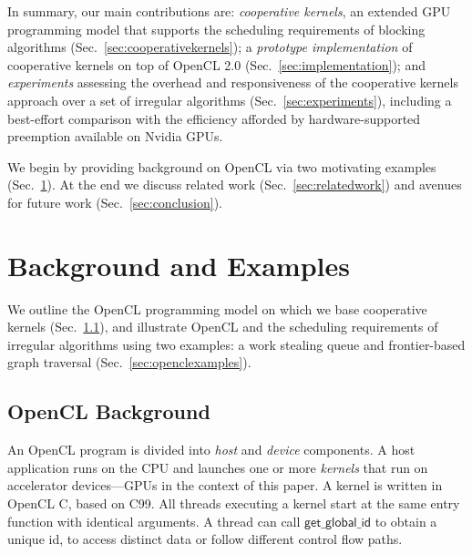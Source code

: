 \documentclass[sigconf]{acmart}
\makeatletter
\newcommand{\cutthree}[1]{}
\renewcommand\paragraph{\@startsection{paragraph}{4}{\z@}%
  {-.5\baselineskip \@plus -2\p@ \@minus -.2\p@}%
  {-3.5\p@}%
  {\bfseries\@parfont}}
\newcommand{\mysec}{Sec.~}
\newcommand{\getglobalid}{\mathsf{get\_global\_id}}
\makeatother
\begin{document}
In summary, our main contributions are:
\emph{cooperative kernels}, an extended GPU programming model that supports the scheduling requirements of blocking algorithms (\mysec\ref{sec:cooperativekernels}); a \emph{prototype implementation} of cooperative
  kernels on top of OpenCL 2.0
  (\mysec\ref{sec:implementation}); and \emph{experiments} assessing the overhead and responsiveness of the cooperative kernels approach over a set of irregular algorithms \cutthree{across three GPUs} (\mysec\ref{sec:experiments}), including a best-effort comparison with the efficiency afforded by hardware-supported preemption available on Nvidia GPUs.

We begin by providing background on OpenCL via two motivating examples (\mysec\ref{sec:background}).  At the end we discuss related work (\mysec\ref{sec:relatedwork}) and avenues for future work (\mysec\ref{sec:conclusion}).

\section{Background and Examples}\label{sec:background}

We outline the OpenCL programming model on which we
base cooperative kernels (\mysec\ref{sec:opencl}), and illustrate
OpenCL and the scheduling requirements of irregular algorithms using two examples: a work stealing queue and frontier-based graph traversal
(\mysec\ref{sec:openclexamples}).

\subsection{OpenCL Background}\label{sec:opencl}



An OpenCL program is divided into \emph{host} and \emph{device}
components.  A host application runs on the CPU and launches one or
more \emph{kernels} that run on accelerator devices---GPUs in the
context of this paper.  A kernel is written in OpenCL C, based on C99.
All threads executing a kernel start at the same entry function with
identical arguments.  A thread can call $\getglobalid$
to obtain a unique id, to access distinct data or follow different control flow paths.
\end{document}
